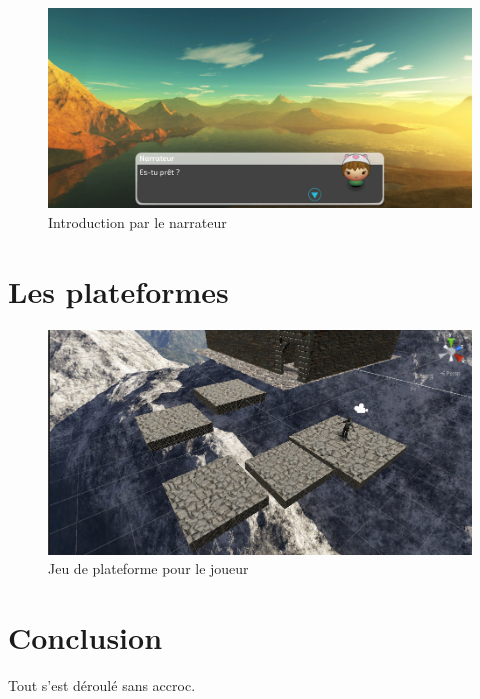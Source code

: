 \documentclass[12pt, french]{article}
\begin{document}
\begin{figure}[h]
\centering
\includegraphics[width = \linewidth]{narrateur}
\caption{Introduction par le narrateur}
\end{figure}

\clearpage
\section{Les plateformes}

\begin{figure}[h]
\centering
\includegraphics[width = \linewidth]{plateforme}
\caption{Jeu de plateforme pour le joueur}
\end{figure}

\section{Conclusion}
Tout s'est déroulé sans accroc.
\end{document}
